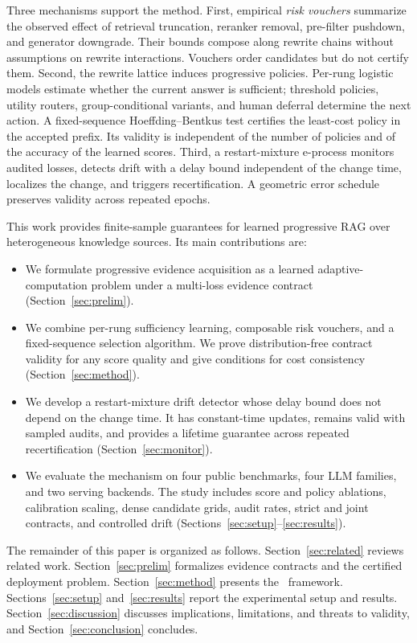 Three mechanisms support the method. First, empirical \emph{risk
vouchers} summarize the observed effect of retrieval truncation,
reranker removal, pre-filter pushdown, and generator downgrade. Their
bounds compose along rewrite chains without assumptions on rewrite
interactions. Vouchers order candidates but do not certify them.
Second, the rewrite lattice induces progressive policies. Per-rung
logistic models estimate whether the current answer is sufficient;
threshold policies, utility routers, group-conditional variants, and
human deferral determine the next action. A fixed-sequence
Hoeffding--Bentkus test certifies the least-cost policy in the accepted
prefix. Its validity is independent of the number of policies and of
the accuracy of the learned scores. Third, a restart-mixture e-process
monitors audited losses, detects drift with a delay bound independent
of the change time, localizes the change, and triggers recertification.
A geometric error schedule preserves validity across repeated epochs.

This work provides finite-sample guarantees for learned progressive RAG
over heterogeneous knowledge sources. Its main contributions are:
\begin{itemize}
\item We formulate progressive evidence acquisition as a learned
adaptive-computation problem under a multi-loss evidence contract
(Section~\ref{sec:prelim}).
\item We combine per-rung sufficiency learning, composable risk
vouchers, and a fixed-sequence selection algorithm. We prove
distribution-free contract validity for any score quality and give
conditions for cost consistency (Section~\ref{sec:method}).
\item We develop a restart-mixture drift detector whose delay bound
does not depend on the change time. It has constant-time updates,
remains valid with sampled audits, and provides a lifetime guarantee
across repeated recertification
(Section~\ref{sec:monitor}).
\item We evaluate the mechanism on four public benchmarks, four LLM
families, and two serving backends. The study includes score and policy
ablations, calibration scaling, dense candidate grids, audit rates,
strict and joint contracts, and controlled drift
(Sections~\ref{sec:setup}--\ref{sec:results}).
\end{itemize}

The remainder of this paper is organized as follows.
Section~\ref{sec:related} reviews related work.
Section~\ref{sec:prelim} formalizes evidence contracts and the
certified deployment problem. Section~\ref{sec:method} presents the
\system\ framework. Sections~\ref{sec:setup} and~\ref{sec:results}
report the experimental setup and results. Section~\ref{sec:discussion}
discusses implications, limitations, and threats to validity, and
Section~\ref{sec:conclusion} concludes.
